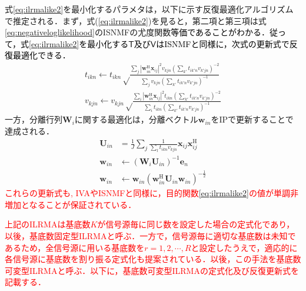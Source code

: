 式\eqref{eq:ilrmalike2}を最小化するパラメタは，以下に示す反復最適化アルゴリズムで推定される．まず，式(\ref{eq:ilrmalike2})を見ると，第二項と第三項は式\eqref{eq:negativeloglikelihood}のISNMFの尤度関数\textcolor{black}{等価であることがわかる．従って，式\eqref{eq:ilrmalike2}を最小化する$\mathsf{T}$及び$\mathsf{V}$はISNMFと同様に，次式の更新式で反復最適化できる．}
\begin{align}
    t_{ikn} \leftarrow t_{ikn} \sqrt \frac{ \sum_j |\bm{w}_{in}^{\mathrm{H}}\bm{x}_{ij}|^2 v_{kjn} \left( \sum_{k'} t_{ik'n} v_{k'jn} \right)^{-2} }{ \sum_j v_{kjn} \left( \sum_{k'} t_{ik'n} v_{k'jn} \right)^{-1} } \label{eq:MUTilrma} \\
    v_{kjn} \leftarrow v_{kjn} \sqrt \frac{ \sum_i |\bm{w}_{in}^{\mathrm{H}}\bm{x}_{ij}|^2 t_{ikn} \left( \sum_{k'} t_{ik'n} v_{k'jn} \right)^{-2} }{ \sum_i t_{ikn} \left( \sum_{k'} t_{ik'n} v_{k'jn} \right)^{-1} } \label{eq:MUVilrma}
\end{align}
一方，分離行列$\bm{W}_i$に関する最適化は，分離ベクトル$\bm{w}_{in}$をIPで更新することで達成される．
\begin{align}
\bm{U}_{in} &= \frac{1}{J} \sum_j \frac{1}{\sum_{l}t_{ikn}v_{kjn}} \bm{x}_{ij} \bm{x}_{ij}^{\mathrm{H}} \label{eq:ip1} \\
\bm{w}_{in} &\leftarrow (\bm{W}_i \bm{U}_{in})^{-1} \bm{e}_n \label{eq:ip2} \\
\bm{w}_{in} &\leftarrow \bm{w}_{in} ( \bm{w}_{in}^{\mathrm{H}} \bm{U}_{in} \bm{w}_{in} )^{-\frac{1}{2}} \label{eq:ip3}
\end{align}
\textcolor{red}{これらの更新式も, IVAやISNMFと同様に，目的関数\eqref{eq:ilrmalike2}の値が単調非増加となることが保証されている．}

\textcolor{red}{上記のILRMAは基底数$K$が信号源毎に同じ数を設定した場合の定式化であり，以後，基底数固定型ILRMAと呼ぶ．一方で，信号源毎に適切な基底数は未知であるため，全信号源に用いる基底数を$r=1, 2, \cdots, R$と設定したうえで，適応的に各信号源に基底数を割り振る定式化も提案されている．以後，この手法を基底数可変型ILRMAと呼ぶ．以下に，基底数可変型ILRMAの定式化及び反復更新式を記載する．}

